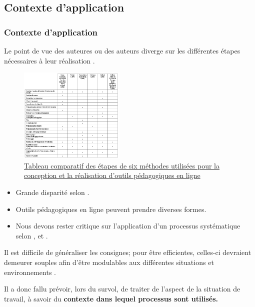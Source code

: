   \subsection{Contexte d'application} 
		\begin{frame}[allowframebreaks]
			\frametitle{Contexte d'application}
			Le point de vue des auteures ou des auteurs diverge sur les différentes étapes nécessaires à leur réalisation \citep[p.18]{bonneau2013a}.
                   \begin{figure}
                     \centering
                     \includegraphics[width = 0.45\textwidth]{tableau6methodes.png}
                     \caption{\tiny{\href{run:tableau6methodes.png}{Tableau comparatif des étapes de six méthodes utilisées pour la conception et la réalisation d’outils pédagogiques en ligne \citep[p.20]{bonneau2013a}}}}
                   \end{figure}
                   \begin{itemize}                   
                   \item Grande disparité selon \citet{bonneau2013a}.
                   \item Outils pédagogiques en ligne peuvent prendre diverses formes.
                   \item Nous devons rester critique sur l’application d’un processus systématique selon \citet[p.10]{retalis1997a}, \citet[p.46]{smith2006a} et \citet[p.3]{pohl2004a}.
                 
                   \end{itemize}
			\framebreak
			\par Il est difficile de généraliser les consignes; pour être efficientes, celles-ci devraient demeurer souples afin d'être modulables aux différentes situations et environnements \citep[p.3]{pohl2004a}.
			\framebreak
			\par  Il a donc fallu prévoir, lors du survol, de traiter de l’aspect de la situation de travail, à savoir du \textbf{contexte dans lequel processus sont utilisés.}
                \end{frame}

